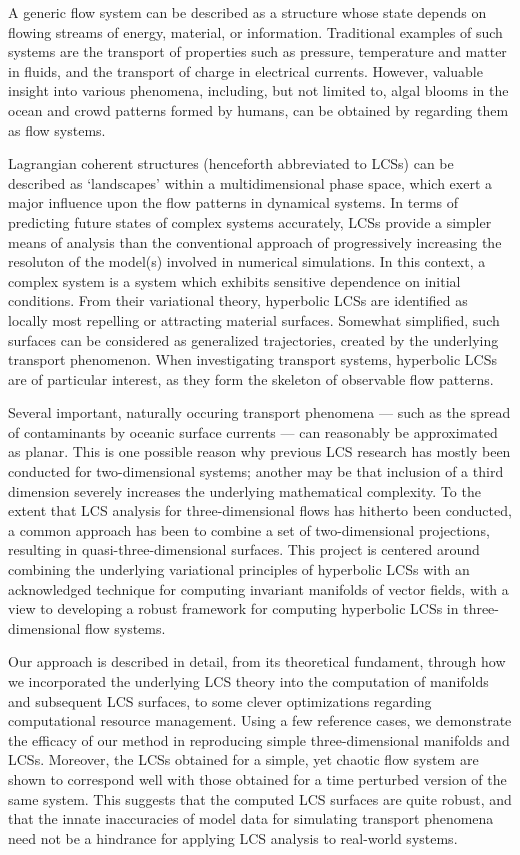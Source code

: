 \begingroup
\vspace{3mm}
A generic flow system can be described as a structure whose state depends on
flowing streams of energy, material, or information. Traditional examples of
such systems are the transport of properties such as pressure, temperature and
matter in fluids, and the transport of charge in electrical currents. However,
valuable insight into various phenomena, including, but not limited to, algal
blooms in the ocean and crowd patterns formed by humans, can be obtained by
regarding them as flow systems.

Lagrangian coherent structures (henceforth abbreviated to LCSs) can be
described as `landscapes' within a multidimensional phase space, which exert a
major influence upon the flow patterns in dynamical systems. In terms of
predicting future states of complex systems accurately, LCSs provide a simpler
means of analysis than the conventional approach of progressively increasing
the resoluton of the model(s) involved in numerical simulations. In this
context, a complex system is a system which exhibits sensitive dependence on
initial conditions. From their variational theory, hyperbolic LCSs are
identified as locally most repelling or attracting material surfaces. Somewhat
simplified, such surfaces can be considered as generalized trajectories,
created by the underlying transport phenomenon. When investigating transport
systems, hyperbolic LCSs are of particular interest, as they form the skeleton
of observable flow patterns.

Several important, naturally occuring transport phenomena --- such as the
spread of contaminants by oceanic surface currents --- can reasonably be
approximated as planar. This is one possible reason why previous
LCS research has mostly been conducted for two-dimensional systems; another may
be that inclusion of a third dimension severely increases the underlying
mathematical complexity. To the extent that LCS analysis for three-dimensional
flows has hitherto been conducted, a common approach has been to combine a set
of two-dimensional projections, resulting in quasi-three-dimensional surfaces.
This project is centered around combining the underlying variational principles
of hyperbolic LCSs with an acknowledged technique for computing invariant
manifolds of vector fields, with a view to developing a robust framework for
computing hyperbolic LCSs in three-dimensional flow systems.

Our approach is described in detail, from its theoretical fundament, through
how we incorporated the underlying LCS theory into the computation of manifolds
and subsequent LCS surfaces, to some clever optimizations regarding
computational resource management. Using a few reference cases, we demonstrate
the efficacy of our method in reproducing simple three-dimensional manifolds
and LCSs. Moreover, the LCSs obtained for a simple, yet chaotic flow
system are shown to correspond well with those obtained for a time perturbed
version of the same system. This suggests that the computed LCS surfaces are
quite robust, and that the innate inaccuracies of model data for simulating
transport phenomena need not be a hindrance for applying LCS analysis to
real-world systems.

